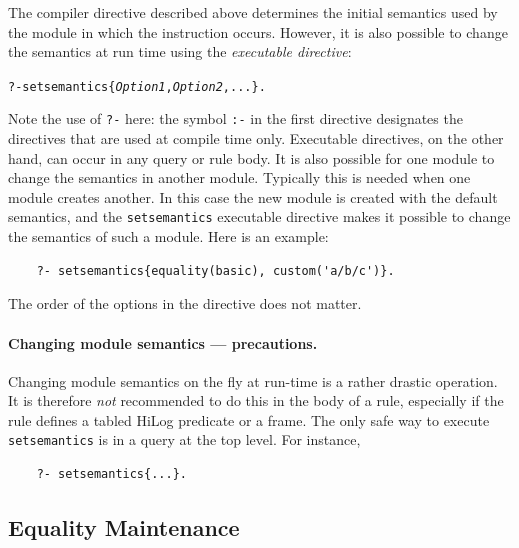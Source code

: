 \documentclass[11pt]{article}
\begin{document}
The compiler directive described above determines the initial semantics used
by the module in which the instruction occurs. However, it is also possible
to change the semantics at run time using the \emph{executable directive}:
\begin{alltt}
    ?- setsemantics\{\emph{Option1}, \emph{Option2}, ...\}.
\end{alltt}
Note the use of {\tt ?-} here: the symbol {\tt :-} in the first directive
designates the directives that are used at compile time only.  Executable
directives, on the other hand, can occur in any query or rule body.  It is
also possible for one module to change the semantics in another module.
Typically this is needed when one module creates another. In this case the
new module is created with the default semantics, and the {\tt setsemantics}
executable directive makes it possible to change the semantics of such a
module. Here is an example:
\begin{verbatim}
    ?- setsemantics{equality(basic), custom('a/b/c')}.  
\end{verbatim}
The order of the options in the directive does not matter.

\paragraph{Changing module semantics --- precautions.}
Changing module semantics on the fly at run-time is a rather drastic operation.
It is therefore \emph{not} recommended to do this in the body of a rule,
especially if the rule defines a tabled HiLog predicate or a frame.
The only safe way to execute {\tt setsemantics} is in a query at the top
level. For instance, 
  \begin{verbatim}
    ?- setsemantics{...}.
  \end{verbatim}


\subsection{Equality Maintenance}\label{sec-eqmaintain}
\end{document}
